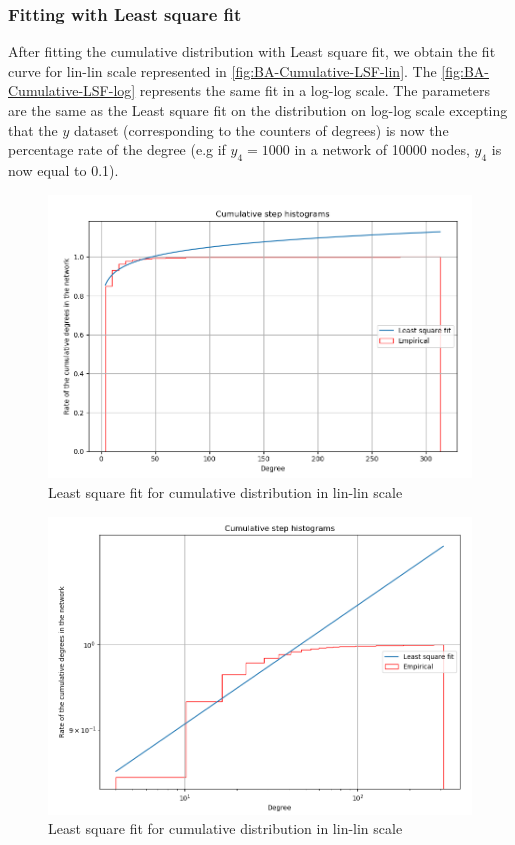 \documentclass{article}
\begin{document}
\newpage
\subsubsection*{Fitting with Least square fit}
After fitting the cumulative distribution with Least square fit, we obtain the fit curve for lin-lin scale represented in \autoref{fig:BA-Cumulative-LSF-lin}. The \autoref{fig:BA-Cumulative-LSF-log} represents the same fit in a log-log scale. The parameters are the same as the Least square fit on the distribution on log-log scale excepting that the $y$ dataset (corresponding to the counters of degrees) is now the percentage rate of the degree (e.g if $y_{4} = 1000$ in a network of 10000 nodes, $y_{4}$ is now equal to 0.1).  

\begin{figure}[H]
  \centering
  \includegraphics[scale=0.45]{fig/BA-Cumulative-LSF-lin.png}
  \caption{Least square fit for cumulative distribution in lin-lin scale}
  \label{fig:BA-Cumulative-LSF-lin}
\end{figure}

\begin{figure}[H]
  \centering
  \includegraphics[scale=0.45]{fig/BA-Cumulative-LSF-log.png}
  \caption{Least square fit for cumulative distribution in lin-lin scale}
  \label{fig:BA-Cumulative-LSF-log}
\end{figure}
\end{document}

